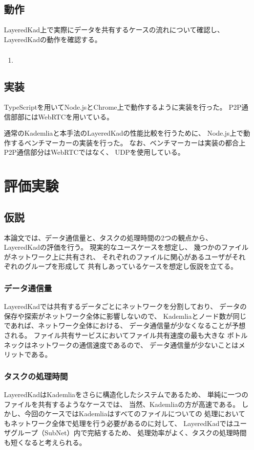 \documentclass[sotsuron]{jcsie}
\begin{document}
\section{動作}
LayeredKad上で実際にデータを共有するケースの流れについて確認し、
LayeredKadの動作を確認する。
\subsection{}
\begin{enumerate}
	\item 
\end{enumerate}

\section{実装}
TypeScriptを用いてNode.jsとChrome上で動作するように実装を行った。
P2P通信部部にはWebRTCを用いている。

通常のKademliaと本手法のLayeredKadの性能比較を行うために、
Node.js上で動作するベンチマーカーの実装を行った。
なお、ベンチマーカーは実装の都合上P2P通信部分はWebRTCではなく、
UDPを使用している。

\chapter{評価実験}
\section{仮説}
本論文では、データ通信量と、タスクの処理時間の2つの観点から、
LayeredKadの評価を行う。
現実的なユースケースを想定し、
幾つかのファイルがネットワーク上に共有され、
それぞれのファイルに関心があるユーザがそれぞれのグループを形成して
共有しあっているケースを想定し仮説を立てる。
\subsection{データ通信量}
LayeredKadでは共有するデータごとにネットワークを分割しており、
データの保存や探索がネットワーク全体に影響しないので、
Kademliaとノード数が同じであれば、ネットワーク全体における、
データ通信量が少なくなることが予想される。
ファイル共有サービスにおいてファイル共有速度の最も大きな
ボトルネックはネットワークの通信速度であるので、
データ通信量が少ないことはメリットである。
\subsection{タスクの処理時間}
LayeredKadはKademliaをさらに構造化したシステムであるため、
単純に一つのファイルを共有するようなケースでは、
当然、Kademliaの方が高速である。
しかし、今回のケースではKademliaはすべてのファイルについての
処理においてもネットワーク全体で処理を行う必要があるのに対して、
LayeredKadではユーザグループ（SubNet）内で完結するため、
処理効率がよく、タスクの処理時間も短くなると考えられる。
\end{document}
